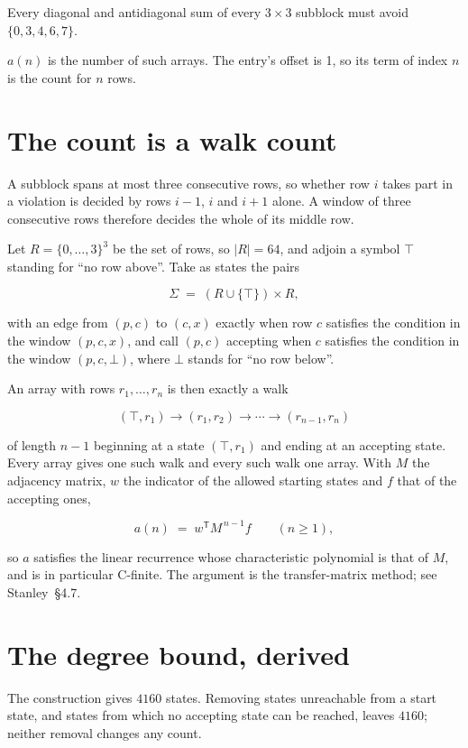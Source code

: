 \documentclass[11pt]{article}
\theoremstyle{definition}
\begin{document}
Every diagonal and antidiagonal sum of every $3\times3$ subblock must avoid $\{0, 3, 4, 6, 7\}$.

$a(n)$ is the number of such arrays. The entry's offset is 1, so its term of index $n$ is the count for $n$ rows.

\section{The count is a walk count}

A subblock spans at most three consecutive rows, so whether row $i$ takes part in a violation is decided by rows $i-1$, $i$ and $i+1$ alone. A window of three consecutive rows therefore decides the whole of its middle row.

Let $R = \{0,\dots,3\}^{3}$ be the set of rows, so $|R| = 64$, and adjoin a symbol $\top$ standing for ``no row above''. Take as states the pairs

\[\Sigma \;=\; (R \cup \{\top\}) \times R,\]

with an edge from $(p,c)$ to $(c,x)$ exactly when row $c$ satisfies the condition in the window $(p,c,x)$, and call $(p,c)$ accepting when $c$ satisfies the condition in the window $(p,c,\bot)$, where $\bot$ stands for ``no row below''.

An array with rows $r_1,\dots,r_n$ is then exactly a walk

\[(\top,r_1) \to (r_1,r_2) \to \cdots \to (r_{n-1},r_n)\]

of length $n-1$ beginning at a state $(\top,r_1)$ and ending at an accepting state. Every array gives one such walk and every such walk one array. With $M$ the adjacency matrix, $w$ the indicator of the allowed starting states and $f$ that of the accepting ones,

\[a(n) \;=\; w^{\mathsf T} M^{\,n-1} f \qquad (n \ge 1),\]

so $a$ satisfies the linear recurrence whose characteristic polynomial is that of $M$, and is in particular C-finite. The argument is the transfer-matrix method; see Stanley~\S4.7.

\section{The degree bound, derived}

The construction gives $4160$ states. Removing states unreachable from a start state, and states from which no accepting state can be reached, leaves $4160$; neither removal changes any count.
\end{document}
